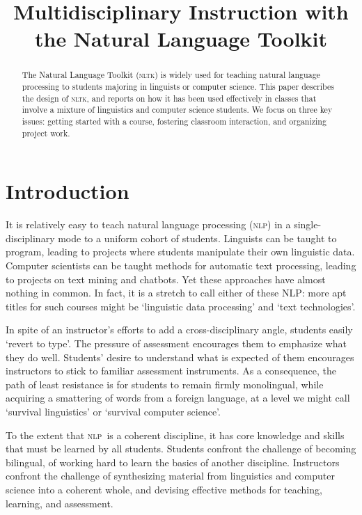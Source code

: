 \documentclass[11pt]{article}
\title{Multidisciplinary Instruction with the Natural Language Toolkit}
\author{}
\date{}
\newcommand{\NLP}{\textsc{nlp}}
\newcommand{\NLTK}{\textsc{nltk}}
\begin{document}
\maketitle
\begin{abstract}
  The Natural Language Toolkit (\NLTK) is widely used for teaching
  natural language processing to students majoring in linguists or
  computer science.  This paper describes the design of \NLTK, and
  reports on how it has been used effectively in classes that involve
  a mixture of linguistics and computer science students.  We focus
  on three key issues: getting started with a course, fostering
  classroom interaction, and organizing project work.
\end{abstract}

\section{Introduction}

It is relatively easy to teach natural language processing (\NLP) in a
single-disciplinary mode to a uniform cohort of students.  Linguists
can be taught to program, leading to projects where students
manipulate their own linguistic data.  Computer scientists can be
taught methods for automatic text processing, leading to projects on
text mining and chatbots.  Yet these approaches have almost nothing in
common.  In fact, it is a stretch to call either of these NLP: more apt
titles for such courses might be `linguistic data processing' and
`text technologies'.

In spite of an instructor's efforts to add a cross-disciplinary angle, students
easily `revert to type'.  The pressure of assessment encourages them to emphasize
what they do well.  Students' desire to understand what is expected of them encourages
instructors to stick to familiar assessment instruments.  As a consequence,
the path of least resistance is for students to remain firmly monolingual, while
acquiring a smattering of words from a foreign language, at a level we might
call `survival linguistics' or `survival computer science'.

To the extent that \NLP\ is a coherent discipline, it has core knowledge and skills that
must be learned by all students.  Students confront the challenge of becoming bilingual,
of working hard to learn the basics of another discipline.  Instructors confront the
challenge of synthesizing material from linguistics and computer science into a coherent
whole, and devising effective methods for teaching, learning, and assessment.
\end{document}
